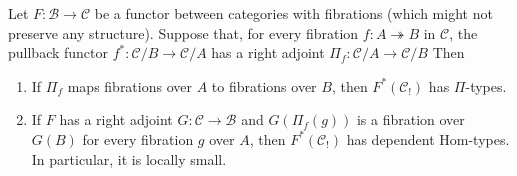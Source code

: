 \documentclass[reqno]{amsart}
\theoremstyle{definition}
\theoremstyle{remark}
\newcommand{\fs}[1]{\mathrm{#1}}
\newcommand{\scat}[1]{\mathcal{#1}}
\newcommand{\Hom}{\fs{Hom}}
\numberwithin{figure}{section}
\begin{document}
\begin{prop}
Let $F : \scat{B} \to \scat{C}$ be a functor between categories with fibrations (which might not preserve any structure).
Suppose that, for every fibration $f : A \twoheadrightarrow B$ in $\scat{C}$, the pullback functor $f^* : \scat{C}/B \to \scat{C}/A$ has a right adjoint $\Pi_f : \scat{C}/A \to \scat{C}/B$
Then
\begin{enumerate}
\item If $\Pi_f$ maps fibrations over $A$ to fibrations over $B$, then $F^*(\scat{C}_!)$ has $\Pi$-types.
\item If $F$ has a right adjoint $G : \scat{C} \to \scat{B}$ and $G(\Pi_f(g))$ is a fibration over $G(B)$ for every fibration $g$ over $A$, then $F^*(\scat{C}_!)$ has dependent $\Hom$-types.
In particular, it is locally small.
\end{enumerate}
\end{prop}
\end{document}

